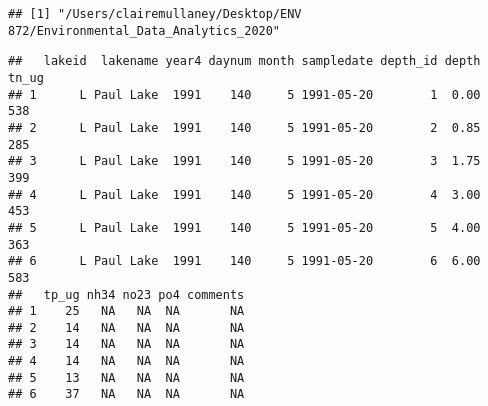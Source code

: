 \documentclass[]{article}
\newenvironment{Shaded}{\begin{snugshade}}{\end{snugshade}}
\newcommand{\CommentTok}[1]{\textcolor[rgb]{0.56,0.35,0.01}{\textit{#1}}}
\newcommand{\DataTypeTok}[1]{\textcolor[rgb]{0.13,0.29,0.53}{#1}}
\newcommand{\KeywordTok}[1]{\textcolor[rgb]{0.13,0.29,0.53}{\textbf{#1}}}
\newcommand{\NormalTok}[1]{#1}
\newcommand{\OperatorTok}[1]{\textcolor[rgb]{0.81,0.36,0.00}{\textbf{#1}}}
\newcommand{\StringTok}[1]{\textcolor[rgb]{0.31,0.60,0.02}{#1}}
\begin{document}
\begin{Shaded}
\end{Shaded}

\begin{verbatim}
## [1] "/Users/clairemullaney/Desktop/ENV 872/Environmental_Data_Analytics_2020"
\end{verbatim}

\begin{Shaded}
\end{Shaded}

\begin{verbatim}
##   lakeid  lakename year4 daynum month sampledate depth_id depth tn_ug
## 1      L Paul Lake  1991    140     5 1991-05-20        1  0.00   538
## 2      L Paul Lake  1991    140     5 1991-05-20        2  0.85   285
## 3      L Paul Lake  1991    140     5 1991-05-20        3  1.75   399
## 4      L Paul Lake  1991    140     5 1991-05-20        4  3.00   453
## 5      L Paul Lake  1991    140     5 1991-05-20        5  4.00   363
## 6      L Paul Lake  1991    140     5 1991-05-20        6  6.00   583
##   tp_ug nh34 no23 po4 comments
## 1    25   NA   NA  NA       NA
## 2    14   NA   NA  NA       NA
## 3    14   NA   NA  NA       NA
## 4    14   NA   NA  NA       NA
## 5    13   NA   NA  NA       NA
## 6    37   NA   NA  NA       NA
\end{verbatim}

\begin{Shaded}
\end{Shaded}
\end{document}
